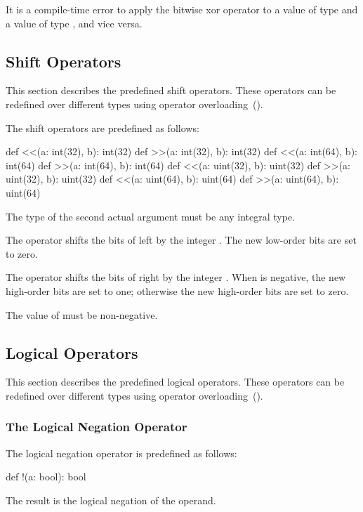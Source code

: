 It is a compile-time error to apply the bitwise xor operator to a
value of type  and a value of type , and
vice versa.

\subsection{Shift Operators}
\label{Shift_Operators}

This section describes the predefined shift operators.  These
operators can be redefined over different types using operator
overloading~().

The shift operators are predefined as follows:
\begin{chapel}
def <<(a: int(32), b): int(32)
def >>(a: int(32), b): int(32)
def <<(a: int(64), b): int(64)
def >>(a: int(64), b): int(64)
def <<(a: uint(32), b): uint(32)
def >>(a: uint(32), b): uint(32)
def <<(a: uint(64), b): uint(64)
def >>(a: uint(64), b): uint(64)
\end{chapel}
The type of the second actual argument must be any integral type.

The \chpl{<<} operator shifts the bits of  left by the
integer .  The new low-order bits are set to zero.

The \chpl{>>} operator shifts the bits of  right by the
integer .  When  is negative, the new high-order bits
are set to one; otherwise the new high-order bits are set to zero.

The value of  must be non-negative.

\subsection{Logical Operators}
\label{Logical_Operators}

This section describes the predefined logical operators.  These
operators can be redefined over different types using operator
overloading~().

\subsubsection{The Logical Negation Operator}
\label{Logical_Negation_Operators}

The logical negation operator is predefined as follows:
\begin{chapel}
def !(a: bool): bool
\end{chapel}
The result is the logical negation of the operand.

